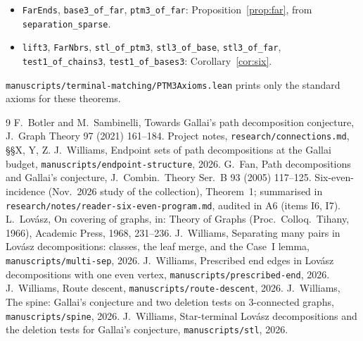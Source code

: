 \documentclass[11pt]{amsart}
\theoremstyle{definition}
\begin{document}
\begin{itemize}
\begin{itemize}
  \texttt{base3G\_parity}, \texttt{leaf\_walk}, \texttt{merge3}, \texttt{ptm3\_of\_base}:
  Definition~\ref{def:chain} and Theorem~\ref{thm:chain}; the conclusion is \texttt{PTM3At}. The
  three leaves live in \texttt{Option (Option (Option W))}.
  \item \texttt{FarEnds}, \texttt{base3\_of\_far}, \texttt{ptm3\_of\_far}:
  Proposition~\ref{prop:far}, from \texttt{separation\_sparse}.
  \item \texttt{lift3}, \texttt{FarNbrs}, \texttt{stl\_of\_ptm3}, \texttt{stl3\_of\_base},
  \texttt{stl3\_of\_far}, \texttt{test1\_of\_chains3}, \texttt{test1\_of\_bases3}:
  Corollary~\ref{cor:six}.
  \end{itemize}
  \texttt{manuscripts/terminal-matching/PTM3Axioms.lean} prints only the standard axioms for these
  theorems.
\end{itemize}

\begin{thebibliography}{9}
 F.~Botler and M.~Sambinelli, Towards Gallai's path decomposition conjecture, J.~Graph
Theory 97 (2021) 161--184.
 Project notes, \texttt{research/connections.md}, \S\S X, Y, Z.
 J.~Williams, Endpoint sets of path decompositions at the Gallai budget,
\texttt{manuscripts/endpoint-structure}, 2026.
 G.~Fan, Path decompositions and Gallai's conjecture, J.~Combin.\ Theory Ser.~B 93
(2005) 117--125.
 Six-even-incidence (Nov.~2026 study of the collection), Theorem~1; summarised in
\texttt{research/notes/reader-six-even-program.md}, audited in A6 (items I6, I7).
 L.~Lov\'asz, On covering of graphs, in: Theory of Graphs (Proc.\ Colloq.\ Tihany,
1966), Academic Press, 1968, 231--236.
 J.~Williams, Separating many pairs in Lov\'asz decompositions: classes, the leaf
merge, and the Case~I lemma, \texttt{manuscripts/multi-sep}, 2026.
 J.~Williams, Prescribed end edges in Lov\'asz decompositions with one even vertex,
\texttt{manuscripts/prescribed-end}, 2026.
 J.~Williams, Route descent, \texttt{manuscripts/route-descent}, 2026.
 J.~Williams, The spine: Gallai's conjecture and two deletion tests on $3$-connected
graphs, \texttt{manuscripts/spine}, 2026.
 J.~Williams, Star-terminal Lov\'asz decompositions and the deletion tests for
Gallai's conjecture, \texttt{manuscripts/stl}, 2026.
\end{thebibliography}
\end{document}
